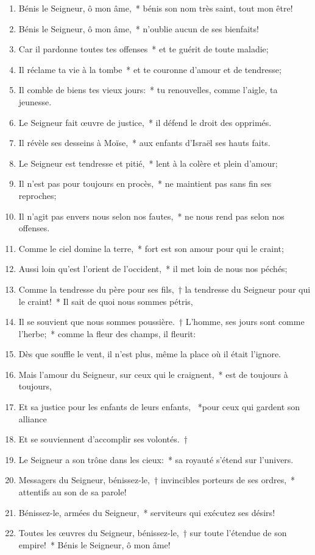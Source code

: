 \documentclass[twoside]{article}
\begin{document}
\begin{paracol}[1]{2}
\begin{enumerate}[wide, itemsep=0mm, labelwidth=!, labelindent=0pt, label=\color{gregoriocolor}\theenumi]
\item Bénis le Seigneur, ô mon âme,~* bénis son nom très saint, tout mon être!
\item Bénis le Seigneur, ô mon âme,~* n'oublie aucun de ses bienfaits!
\item Car il pardonne toutes tes offenses~* et te guérit de toute maladie;
\item Il réclame ta vie à la tombe~* et te couronne d'amour et de tendresse;
\item Il comble de biens tes vieux jours:~* tu renouvelles, comme l'aigle, ta jeunesse.
\item Le Seigneur fait œuvre de justice,~* il défend le droit des opprimés.
\item Il révèle ses desseins à Moïse,~* aux enfants d'Israël ses hauts faits.
\item Le Seigneur est tendresse et pitié,~* lent à la colère et plein d'amour;
\item Il n'est pas pour toujours en procès,~* ne maintient pas sans fin ses reproches;
\item Il n'agit pas envers nous selon nos fautes,~* ne nous rend pas selon nos offenses.
\item Comme le ciel domine la terre,~* fort est son amour pour qui le craint;
\item Aussi loin qu'est l'orient de l'occident,~* il met loin de nous nos péchés;
\item Comme la tendresse du père pour ses fils,~† la tendresse du Seigneur pour qui le craint!~* Il sait de quoi nous sommes pétris,
\item Il se souvient que nous sommes poussière.~† L'homme, ses jours sont comme l'herbe;~* comme la fleur des champs, il fleurit:
\item Dès que souffle le vent, il n'est plus, même la place où il était l'ignore.
\item Mais l'amour du Seigneur, sur ceux qui le craignent,~* est de toujours à toujours,
\item Et sa justice pour les enfants de leurs enfants, ~*pour ceux qui gardent son alliance
\item Et se souviennent d'accomplir ses volontés.~†
\item Le Seigneur a son trône dans les cieux:~* sa royauté s'étend sur l'univers.
\item Messagers du Seigneur, bénissez-le,~† invincibles porteurs de ses ordres,~* attentifs au son de sa parole!
\item Bénissez-le, armées du Seigneur,~* serviteurs qui exécutez ses désirs!
\item Toutes les œuvres du Seigneur, bénissez-le,~† sur toute l'étendue de son empire!~* Bénis le Seigneur, ô mon âme!
\end{enumerate}


\end{paracol}
\end{document}
